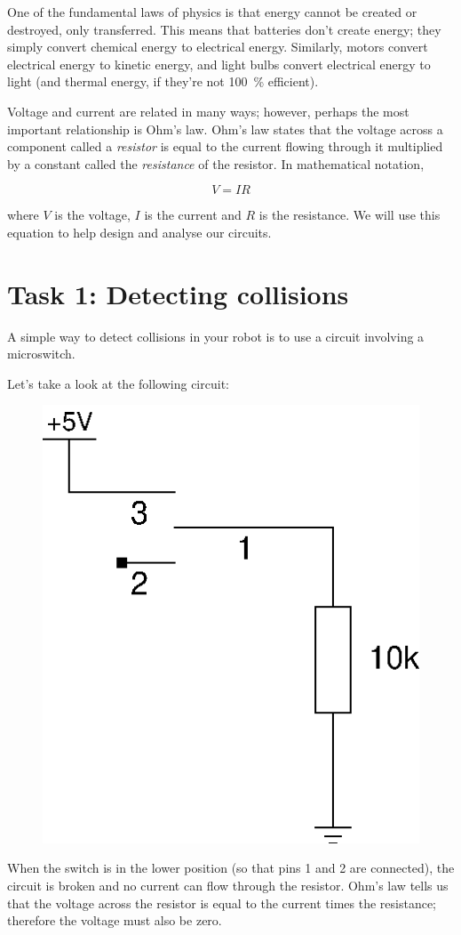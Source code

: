 \documentclass{article}
\begin{document}
One of the fundamental laws of physics is that energy cannot be created or
destroyed, only transferred. This means that batteries don't create energy;
they simply convert chemical energy to electrical energy. Similarly, motors
convert electrical energy to kinetic energy, and light bulbs convert electrical
energy to light (and thermal energy, if they're not \SI{100}{\percent}
efficient).

Voltage and current are related in many ways; however, perhaps the most
important relationship is Ohm's law. Ohm's law states that the voltage across
a component called a \emph{resistor} is equal to the current flowing through it
multiplied by a constant called the \emph{resistance} of the resistor. In
mathematical notation,

\begin{equation*}
V = I R
\end{equation*}

where $V$ is the voltage, $I$ is the current and $R$ is the resistance. We will
use this equation to help design and analyse our circuits.

\section{Task 1: Detecting collisions}

A simple way to detect collisions in your robot is to use a circuit involving a
microswitch. 

Let's take a look at the following circuit:

\begin{figure}[h]
\centering
\includegraphics[width=.5\textwidth]{assets/fig/schem/switch}
\label{fig:schem:switch}
\end{figure}

When the switch is in the lower position (so that pins 1 and 2 are connected),
the circuit is broken and no current can flow through the resistor. Ohm's law
tells us that the voltage across the resistor is equal to the current times the
resistance; therefore the voltage must also be zero.
\end{document}
